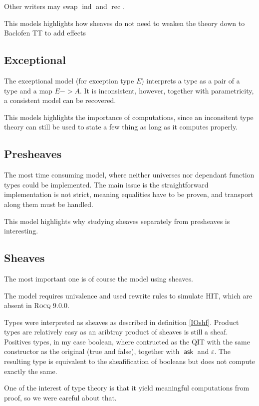 \documentclass[11pt]{article}
\DeclareMathOperator{\ask}{\mathsf{ask}}
\DeclareMathOperator{\rec}{rec}
\DeclareMathOperator{\ind}{ind}
\newcommand{\0}{\mathbf{0}}
\newcommand{\1}{\mathbf{1}}
\begin{document}
Other writers may swap $\ind$ and $\rec$.

This models highlights how sheaves do not need to weaken the theory down to Baclofen TT to add effects

\subsection{Exceptional}

The exceptional model (for exception type $E$) interprets a type as a pair of a type and a map $E -> A$. It is inconsistent, however, together with parametricity, a consistent model can be recovered.

This models highlights the importance of computations, since an inconsitent type theory can still be used to state a few thing as long as it computes properly.

\subsection{Presheaves}

The most time consuming model, where neither universes nor dependant function types could be implemented. The main issue is the straightforward implementation is not strict, meaning equalities have to be proven, and transport along them must be handled.

This model highlights why studying sheaves separately from presheaves is interesting.

\subsection{Sheaves}

The most important one is of course the model using sheaves.

The model requires univalence and used rewrite rules to simulate HIT, which are absent in \textsc{Rocq} 9.0.0.

Types were interpreted as sheaves as described in definition \ref{IOshf}. Product types are relatively easy as an aribtray product of sheaves is still a sheaf. Positives types, in my case boolean, where contructed as the QIT with the same constructor as the original (true and false), together with $\ask$ and $\varepsilon$. The resulting type is equivalent to the sheafification of booleans but does not compute exactly the same.

One of the interest of type theory is that it yield meaningful computations from proof, so we were careful about that.
\end{document}
